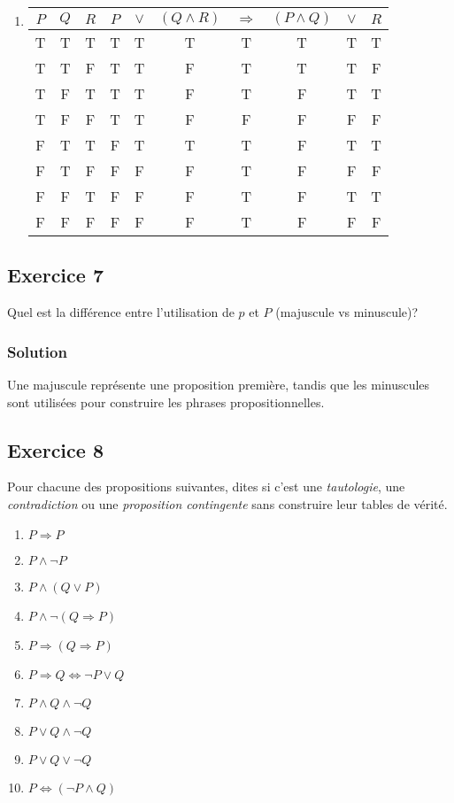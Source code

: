 \begin{enumerate}
	\item  \hspace{1em}

    \begin{center}
    	\begin{tabular}{ccc|ccccccc}
    		$P$ & $Q$ & $R$ & $P$ & $\lor$ & $(Q \land R)$ & $\Rightarrow$ & $(P \land Q)$ & $\lor$ & $R$ \\
    		\hline
    		T & T & T & T & T & T & \color{red}T & T & T & T\\
    		T & T & F & T & T & F & \color{red}T & T & T & F\\
    		T & F & T & T & T & F & \color{red}T & F & T & T\\
    		T & F & F & T & T & F & \color{red}F & F & F & F\\
    		F & T & T & F & T & T & \color{red}T & F & T & T\\
    		F & T & F & F & F & F & \color{red}T & F & F & F\\
    		F & F & T & F & F & F & \color{red}T & F & T & T\\
    		F & F & F & F & F & F & \color{red}T & F & F & F\\
    	\end{tabular}
    \end{center}
\end{enumerate}
\subsection*{Exercice 7}
Quel est la différence entre l'utilisation de $p$ et $P$ (majuscule vs minuscule)?


\subsubsection*{Solution}
    Une majuscule représente une proposition première, tandis que les minuscules sont utilisées pour construire les phrases propositionnelles.\\

\subsection*{Exercice 8}
Pour chacune des propositions suivantes, dites si c'est une
\textit{tautologie}, une \textit{contradiction} ou une \textit{proposition contingente}
sans construire leur tables de vérité.
\begin{enumerate}
	\item $P \Rightarrow P$
	\item $P \land \neg P$
	\item $P \land (Q \lor P)$
	\item $P \land \neg (Q \Rightarrow P)$
	\item $P \Rightarrow (Q \Rightarrow P)$
	\item $P \Rightarrow Q \Leftrightarrow \neg P \lor Q$
	\item $P \land Q \land \neg Q$
	\item $P \lor Q \land \neg Q$
	\item $P \lor Q \lor \neg Q$
	\item $P \Leftrightarrow (\neg P \land Q)$
\end{enumerate}


